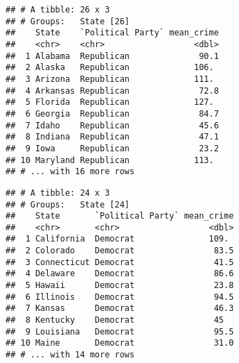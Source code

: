 \documentclass[]{article}
\newenvironment{Shaded}{\begin{snugshade}}{\end{snugshade}}
\newcommand{\CommentTok}[1]{\textcolor[rgb]{0.56,0.35,0.01}{\textit{#1}}}
\newcommand{\DataTypeTok}[1]{\textcolor[rgb]{0.13,0.29,0.53}{#1}}
\newcommand{\KeywordTok}[1]{\textcolor[rgb]{0.13,0.29,0.53}{\textbf{#1}}}
\newcommand{\NormalTok}[1]{#1}
\newcommand{\OperatorTok}[1]{\textcolor[rgb]{0.81,0.36,0.00}{\textbf{#1}}}
\newcommand{\StringTok}[1]{\textcolor[rgb]{0.31,0.60,0.02}{#1}}
\begin{document}
\begin{verbatim}
## # A tibble: 26 x 3
## # Groups:   State [26]
##    State    `Political Party` mean_crime
##    <chr>    <chr>                  <dbl>
##  1 Alabama  Republican              90.1
##  2 Alaska   Republican             106. 
##  3 Arizona  Republican             111. 
##  4 Arkansas Republican              72.8
##  5 Florida  Republican             127. 
##  6 Georgia  Republican              84.7
##  7 Idaho    Republican              45.6
##  8 Indiana  Republican              47.1
##  9 Iowa     Republican              23.2
## 10 Maryland Republican             113. 
## # ... with 16 more rows
\end{verbatim}

\begin{Shaded}
\end{Shaded}

\begin{verbatim}
## # A tibble: 24 x 3
## # Groups:   State [24]
##    State       `Political Party` mean_crime
##    <chr>       <chr>                  <dbl>
##  1 California  Democrat               109. 
##  2 Colorado    Democrat                83.5
##  3 Connecticut Democrat                41.5
##  4 Delaware    Democrat                86.6
##  5 Hawaii      Democrat                23.8
##  6 Illinois    Democrat                94.5
##  7 Kansas      Democrat                46.3
##  8 Kentucky    Democrat                45  
##  9 Louisiana   Democrat                95.5
## 10 Maine       Democrat                31.0
## # ... with 14 more rows
\end{verbatim}

\begin{Shaded}
\end{Shaded}
\end{document}
